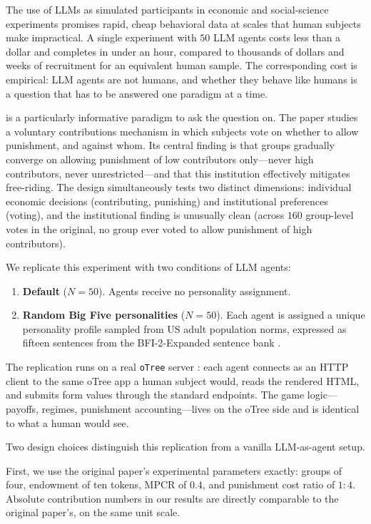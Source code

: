 \documentclass[12pt, a4paper]{article}
\begin{document}
The use of LLMs as simulated participants in economic and social-science experiments \citep{horton2023homo, aher2023turing, argyle2023out} promises rapid, cheap behavioral data at scales that human subjects make impractical. A single experiment with $50$ LLM agents costs less than a dollar and completes in under an hour, compared to thousands of dollars and weeks of recruitment for an equivalent human sample. The corresponding cost is empirical: LLM agents are not humans, and whether they behave like humans is a question that has to be answered one paradigm at a time.

\citet{ertan2009who} is a particularly informative paradigm to ask the question on. The paper studies a voluntary contributions mechanism in which subjects vote on whether to allow punishment, and against whom. Its central finding is that groups gradually converge on allowing punishment of low contributors only---never high contributors, never unrestricted---and that this institution effectively mitigates free-riding. The design simultaneously tests two distinct dimensions: individual economic decisions (contributing, punishing) and institutional preferences (voting), and the institutional finding is unusually clean (across $160$ group-level votes in the original, no group ever voted to allow punishment of high contributors).

We replicate this experiment with two conditions of LLM agents:

\begin{enumerate}
  \item \textbf{Default} ($N=50$). Agents receive no personality assignment.
  \item \textbf{Random Big Five personalities} ($N=50$). Each agent is assigned a unique personality profile sampled from US adult population norms, expressed as fifteen sentences from the BFI-2-Expanded sentence bank \citep{soto2017bfi2}.
\end{enumerate}

The replication runs on a real \texttt{oTree} server \citep{otree}: each agent connects as an HTTP client to the same oTree app a human subject would, reads the rendered HTML, and submits form values through the standard endpoints. The game logic---payoffs, regimes, punishment accounting---lives on the oTree side and is identical to what a human would see.

Two design choices distinguish this replication from a vanilla LLM-as-agent setup.

First, we use the original paper's experimental parameters exactly: groups of four, endowment of ten tokens, MPCR of $0.4$, and punishment cost ratio of $1{:}4$. Absolute contribution numbers in our results are directly comparable to the original paper's, on the same unit scale.
\end{document}
